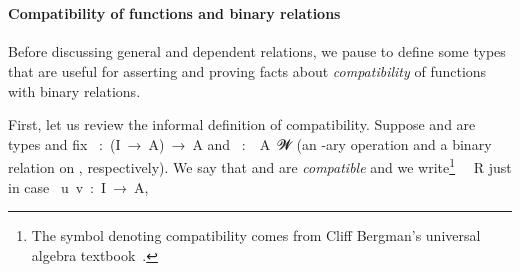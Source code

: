 \ccpad
\begin{code}%
\>[1]\AgdaSpace{}%
\AgdaSymbol{:}\AgdaSpace{}%
\AgdaSpace{}%
\AgdaSpace{}%
\AgdaSpace{}%
\AgdaSpace{}%
\AgdaSymbol{(}\AgdaSpace{}%
\AgdaSpace{}%
\AgdaSymbol{)}\AgdaSpace{}%
\AgdaSpace{}%
\AgdaSpace{}%
\AgdaSpace{}%
\AgdaSpace{}%
\AgdaSpace{}%
\AgdaSpace{}%
\AgdaSpace{}%
\AgdaSpace{}%
\AgdaSpace{}%
\AgdaSpace{}%
\<%
\\
%
\>[1]\AgdaSpace{}%
\AgdaOperator{\AgdaFunction{=[}}\AgdaSpace{}%
\AgdaSpace{}%
\AgdaOperator{\AgdaFunction{]⇒}}\AgdaSpace{}%
\AgdaSpace{}%
\AgdaSymbol{=}\AgdaSpace{}%
\AgdaSpace{}%
\AgdaSpace{}%
\AgdaSymbol{(}\AgdaSpace{}%
\AgdaSpace{}%
\AgdaSymbol{)}\<%
\end{code}

\paragraph*{Compatibility of functions and binary relations}%

Before discussing general and dependent relations, we pause to define some types that are useful for asserting and proving facts about \emph{compatibility} of functions with binary relations. 

First, let us review the informal definition of compatibility. Suppose  and  are types and fix ~\as :~(\ab I~\as →~\ab A)~\as →~\ab A and ~\as :~~\ab A~\ab 𝓦 (an -ary operation and a binary relation on , respectively). We say that  and  are \emph{compatible} and we write\footnote{The symbol \af{\textbar{}:} denoting compatibility comes from Cliff Bergman's universal algebra textbook~\cite{Bergman:2012}.} ~\af{\textbar{}:}~\ab R just in case ~\ab u~\ab v~\as :~\ab I~\as →~\ab A,\\[-8pt]

